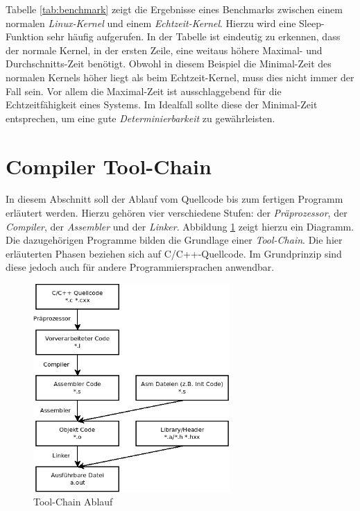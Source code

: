 \documentclass[
  a4paper,					%
  twoside,
  DIV=calc,     				%
  bibliography=totoc,
  cleardoublepage=empty,
  ngerman,     					%
  final       					%
]{scrbook}
\begin{document}
Tabelle \ref{tab:benchmark} zeigt die Ergebnisse eines Benchmarks\cite{rt_linux} zwischen einem normalen \emph{Linux-Kernel} und einem \emph{Echtzeit-Kernel}. Hierzu wird eine Sleep-Funktion sehr häufig aufgerufen. In der Tabelle ist eindeutig zu erkennen, dass der normale Kernel, in der ersten Zeile, eine weitaus höhere Maximal- und Durchschnitts-Zeit benötigt. Obwohl in diesem Beispiel die Minimal-Zeit des normalen Kernels höher liegt als beim Echtzeit-Kernel, muss dies nicht immer der Fall sein. Vor allem die Maximal-Zeit ist ausschlaggebend für die Echtzeitfähigkeit eines Systems. Im Idealfall sollte diese der Minimal-Zeit entsprechen, um eine gute \emph{Determinierbarkeit} zu gewährleisten.









\section{Compiler Tool-Chain}
\label{sec:compiler}
In diesem Abschnitt soll der Ablauf vom Quellcode bis zum fertigen Programm erläutert werden. Hierzu gehören vier verschiedene Stufen: der \emph{Präprozessor}, der \emph{Compiler}, der \emph{Assembler} und der \emph{Linker}. Abbildung \ref{fig:compiler} zeigt hierzu ein Diagramm. Die dazugehörigen Programme bilden die Grundlage einer \emph{Tool-Chain}. Die hier erläuterten Phasen beziehen sich auf C/C++-Quellcode. Im Grundprinzip sind diese jedoch auch für andere Programmiersprachen anwendbar.

\begin{figure}
\includegraphics[width=7.5cm]{compiler}
\caption{Tool-Chain Ablauf\cite{compile}}
\label{fig:compiler}
\end{figure}
\end{document}
